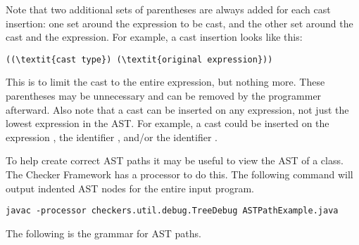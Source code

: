 \documentclass{article}
\newcommand{\code}[1]{\ifmmode{\mbox{\smaller\ttfamily{#1}}}\else{\smaller\ttfamily #1}\fi}
\begin{document}
Note that two additional sets of parentheses are always added for each cast
insertion: one set around the expression to be cast, and the other set around the
cast and the expression. For example, a cast insertion looks like this:

\begin{Verbatim}[commandchars=\\\{\}]
((\textit{cast type}) (\textit{original expression}))
\end{Verbatim}

This is to limit the cast to the entire expression, but
nothing more. These parentheses may be unnecessary and can be removed by the
programmer afterward. Also note that a cast can be inserted on any expression, not
just the lowest expression in the AST. For example, a cast could be inserted on
the expression \code{i + j}, the identifier \code{i}, and/or the identifier \code{j}.

To help create correct AST paths it may be useful to view the AST of a class.
The Checker Framework has a processor to do this. The following command will
output indented AST nodes for the entire input program.

\begin{verbatim}
javac -processor checkers.util.debug.TreeDebug ASTPathExample.java
\end{verbatim}

The following is the grammar for AST paths.
\end{document}
